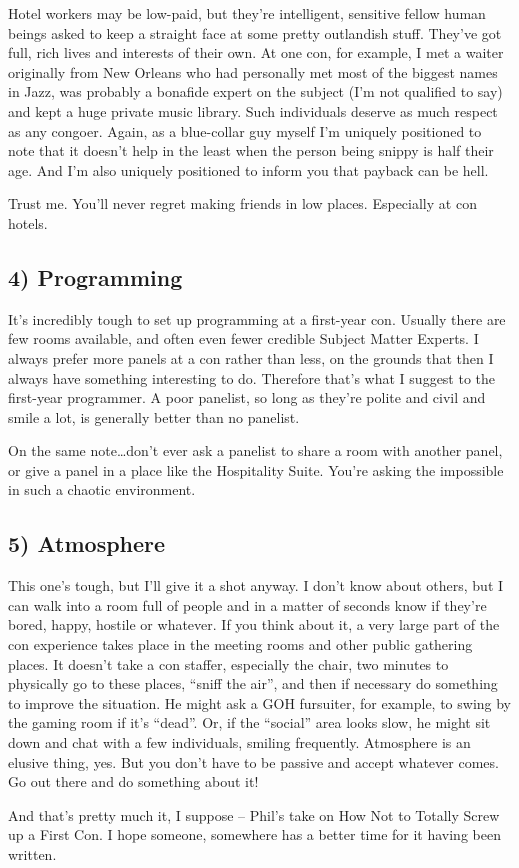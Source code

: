 Hotel workers may be low-paid, but they're intelligent, sensitive fellow human beings asked to keep a straight face at some pretty outlandish stuff. They've got full, rich lives and interests of their own. At one con, for example, I met a waiter originally from New Orleans who had personally met most of the biggest names in Jazz, was probably a bonafide expert on the subject (I'm not qualified to say) and kept a huge private music library. Such individuals deserve as much respect as any congoer. Again, as a blue-collar guy myself I'm uniquely positioned to note that it doesn't help in the least when the person being snippy is half their age. And I'm also uniquely positioned to inform you that payback can be hell.

Trust me. You'll never regret making friends in low places. Especially at con hotels.

\subsection*{4) Programming}

It's incredibly tough to set up programming at a first-year con. Usually there are few rooms available, and often even fewer credible Subject Matter Experts. I always prefer more panels at a con rather than less, on the grounds that then I always have something interesting to do. Therefore that's what I suggest to the first-year programmer. A poor panelist, so long as they're polite and civil and smile a lot, is generally better than no panelist.

On the same note\ldots don't ever ask a panelist to share a room with another panel, or give a panel in a place like the Hospitality Suite. You're asking the impossible in such a chaotic environment.

\subsection*{5) Atmosphere}
This one's tough, but I'll give it a shot anyway. I don't know about others, but I can walk into a room full of people and in a matter of seconds know if they're bored, happy, hostile or whatever. If you think about it, a very large part of the con experience takes place in the meeting rooms and other public gathering places. It doesn't take a con staffer, especially the chair, two minutes to physically go to these places, ``sniff the air'', and then if necessary do something to improve the situation. He might ask a GOH fursuiter, for example, to swing by the gaming room if it's ``dead''. Or, if the ``social'' area looks slow, he might sit down and chat with a few individuals, smiling frequently. Atmosphere is an elusive thing, yes. But you don't have to be passive and accept whatever comes. Go out there and do something about it!

And that's pretty much it, I suppose -- Phil's take on How Not to Totally Screw up a First Con. I hope someone, somewhere has a better time for it having been written.
